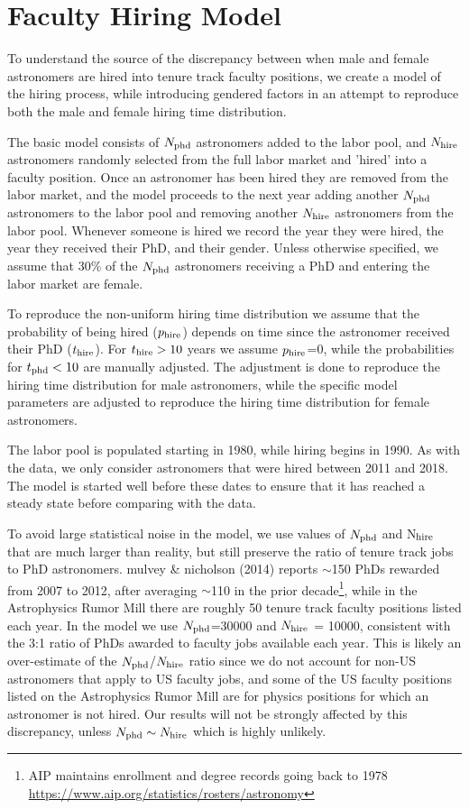 \documentclass[modern]{aastex62}
\begin{document}
\section{Faculty Hiring Model\label{model}}
To understand the source of the discrepancy between when male and female astronomers are hired into tenure track faculty positions, we create a model of the hiring process, while introducing gendered factors in an attempt to reproduce both the male and female hiring time distribution.

The basic model consists of $N_{\rm phd}$ astronomers added to the labor pool, and $N_{\rm hire}$ astronomers randomly selected from the full labor market and 'hired' into a faculty position. Once an astronomer has been hired they are removed from the labor market, and the model proceeds to the next year adding another $N_{\rm phd}$ astronomers to the labor pool and removing another $N_{\rm hire}$ astronomers from the labor pool. Whenever someone is hired we record the year they were hired, the year they received their PhD, and their gender. Unless otherwise specified, we assume that 30\% of the $N_{\rm phd}$ astronomers receiving a PhD and entering the labor market are female. 

To reproduce the non-uniform hiring time distribution we assume that the probability of being hired ($p_{\rm hire}$) depends on time since the astronomer received their PhD ($t_{\rm hire}$). For $t_{\rm hire}>10$ years we assume $p_{\rm hire}$=0, while the probabilities for $t_{\rm phd}<10$ are manually adjusted. The adjustment is done to reproduce the hiring time distribution for male astronomers, while the specific model parameters are adjusted to reproduce the hiring time distribution for female astronomers. 

The labor pool is populated starting in 1980, while hiring begins in 1990. As with the data, we only consider astronomers that were hired between 2011 and 2018. The model is started well before these dates to ensure that it has reached a steady state before comparing with the data.

To avoid large statistical noise in the model, we use values of $N_{\rm phd}$ and N$_{\rm hire}$ that are much larger than reality, but still preserve the ratio of tenure track jobs to PhD astronomers. mulvey \& nicholson (2014) reports $\sim$150 PhDs rewarded from 2007 to 2012, after averaging $\sim$110 in the prior decade\footnote{AIP maintains enrollment and degree records going back to 1978 \url{https://www.aip.org/statistics/rosters/astronomy}}, while in the Astrophysics Rumor Mill there are roughly 50 tenure track faculty positions listed each year. In the model we use $N_{\rm phd}$=30000 and $N_{\rm hire}$ = 10000, consistent with the 3:1 ratio of PhDs awarded to faculty jobs available each year. This is likely an over-estimate of the $N_{\rm phd}$/$N_{\rm hire}$ ratio since we do not account for non-US astronomers that apply to US faculty jobs, and some of the US faculty positions listed on the Astrophysics Rumor Mill are for physics positions for which an astronomer is not hired. Our results will not be strongly affected by this discrepancy, unless $N_{\rm phd}\sim N_{\rm hire}$ which is highly unlikely. 
\end{document}
